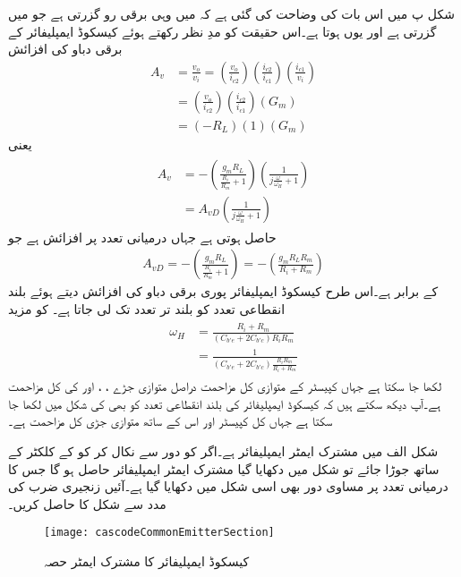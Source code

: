 شکل  پ میں اس بات کی وضاحت کی گئی ہے کہ  میں وہی برقی رو گزرتی ہے جو  میں گزرتی ہے اور یوں  ہوتا ہے۔اس حقیقت کو مدِ نظر رکھتے ہوئے کیسکوڈ ایمپلیفائر کے برقی دباو کی افزائش 
\begin{align*}
A_v&=\frac{v_o}{v_i}=\left( \frac{v_o}{i_{c2}} \right) \left(\frac{i_{c2}}{i_{c1}} \right) \left(\frac{i_{c1}}{v_i} \right)\\
&=\left( \frac{v_o}{i_{c2}} \right) \left(\frac{i_{c2}}{i_{c1}} \right) \left(G_m \right)\\
&=\left(-R_L \right) \left(1 \right) \left(G_m \right)
\end{align*}
یعنی
\begin{gather}
\begin{aligned}
A_v&=-\left(\frac{g_m R_L}{\frac{R_i}{R_m}+1} \right) \left(\frac{1}{j \frac{\omega}{\omega_H} +1}\right)\\
&=A_{vD} \left(\frac{1}{j \frac{\omega}{\omega_H} +1}\right)
\end{aligned}
\end{gather}
حاصل ہوتی ہے جہاں  درمیانی تعدد پر افزائش ہے جو
\begin{align}\label{مساوات_تعددی_ردعمل_کیسکوڈ_درمیانی_تعدد_کی_افزائش}
A_{vD}=-\left(\frac{g_m R_L}{\frac{R_i}{R_m}+1} \right) =-\left(\frac{g_m R_L R_m}{R_i+R_m}\right)
\end{align}
کے برابر ہے۔اس طرح کیسکوڈ ایمپلیفائر پوری برقی دباو کی افزائش دیتے ہوئے بلند انقطاعی تعدد کو بلند تر تعدد تک لی جاتا ہے۔ کو مزید
\begin{gather}
\begin{aligned}\label{مساوات_تعددی_ردعمل_کیسکوڈ_بلند_انقطاعی_تعدد}
\omega_H&= \frac{R_i+R_m}{\left( C_{b'e}+2 C_{b'c} \right)  R_i R_m}\\
&=\frac{1}{\left( C_{b'e}+2 C_{b'c} \right)  \frac{R_i R_m}{R_i+R_m}}
\end{aligned}
\end{gather}
لکھا جا سکتا ہے جہاں کپیسٹر  کے متوازی کل مزاحمت   دراصل متوازی جڑے ، ،  اور  کی کل مزاحمت ہے۔آپ دیکھ سکتے ہیں کہ کیسکوڈ ایمپلیفائر کی بلند انقطاعی تعدد کو بھی  کی شکل میں لکھا جا سکتا ہے جہاں  کل کپیسٹر اور  اس کے ساتھ متوازی جڑی کل مزاحمت ہے۔

شکل  الف میں مشترک ایمٹر ایمپلیفائر ہے۔اگر  کو دور سے نکال کر  کو  کے کلکٹر کے ساتھ جوڑا جائے تو شکل  میں دکھایا گیا مشترک ایمٹر ایمپلیفائر حاصل ہو گا جس کا درمیانی تعدد پر مساوی دور بھی اسی شکل میں دکھایا گیا ہے۔آئیں زنجیری ضرب کی مدد سے شکل  کا  حاصل کریں۔
\begin{figure}
\centering
\texttt{[image: cascodeCommonEmitterSection]}
\caption{کیسکوڈ ایمپلیفائر کا مشترک ایمٹر حصہ}
\label{شکل_تعددی_ردعمل_کیسکوڈ_ایمپلیفائر_مشترک_مخارج_حصہ}
\end{figure}

